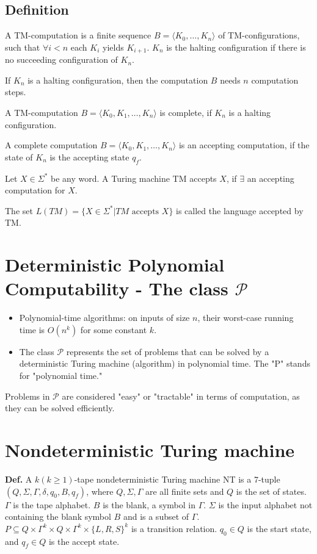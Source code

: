 \documentclass[12pt,openany]{book}
\theoremstyle{definition}
\begin{document}
	\subsection{Definition}
	
	A TM-computation is a finite sequence \( B = \langle K_0, \ldots, K_n \rangle \) of TM-configurations, such that \( \forall i < n \) each \( K_i \) yields \( K_{i+1} \). \( K_n \) is the halting configuration if there is no succeeding configuration of \( K_n \).
	
	If \( K_n \) is a halting configuration, then the computation \( B \) needs \( n \) computation steps.

	
	A TM-computation \( B = \langle K_0, K_1, \ldots, K_n \rangle \) is complete, if \( K_n \) is a halting configuration.
	
	A complete computation \( B = \langle K_0, K_1, \ldots, K_n \rangle \) is an accepting computation, if the state of \( K_n \) is the accepting state \( q_f \).

	Let \( X \in \Sigma^* \) be any word. A Turing machine TM accepts \( X \), if \( \exists \) an accepting computation for \( X \).
	
	The set \( L(TM) = \{ X \in \Sigma^* | TM \text{ accepts } X \} \) is called the language accepted by TM.
	\section{Deterministic Polynomial Computability - The class \( \mathcal{P} \)}
	
	\begin{itemize}
		\item Polynomial-time algorithms: on inputs of size \( n \), their worst-case running time is \( O(n^k) \) for some constant \( k \).
		\item The class \( \mathcal{P} \) represents the set of problems that can be solved by a deterministic Turing machine (algorithm) in polynomial time. The "P" stands for "polynomial time."
	\end{itemize}
	
	Problems in \( \mathcal{P} \) are considered "easy" or "tractable" in terms of computation, as they can be solved efficiently.
	
	\section{Nondeterministic Turing machine}
	
	\textbf{Def.} A \( k (k \geq 1) \)-tape nondeterministic Turing machine NT is a 7-tuple \( (Q, \Sigma, \Gamma, \delta, q_0, B, q_f) \), where \( Q, \Sigma, \Gamma \) are all finite sets and \( Q \) is the set of states. \( \Gamma \) is the tape alphabet. \( B \) is the blank, a symbol in \( \Gamma \). \( \Sigma \) is the input alphabet not containing the blank symbol \( B \) and is a subset of \( \Gamma \). \( P \subseteq Q \times \Gamma^k \times Q \times \Gamma^k \times \{L, R, S\}^k \) is a transition relation. \( q_0 \in Q \) is the start state, and \( q_f \in Q \) is the accept state.
	
\end{document}
